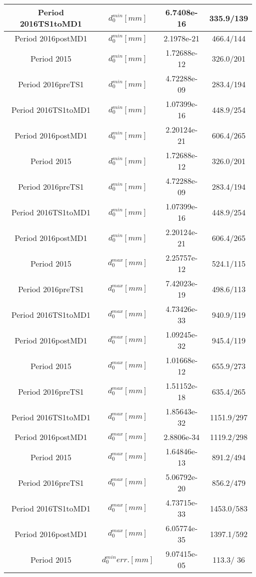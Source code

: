 \documentclass{article}
\begin{document}
\begin{longtable}{c|c|c|c}
\hline
 Period 2016TS1toMD1 & $d_{0}^{min} [mm]$ & 6.7408e-16 & 335.9/139\\
\hline
 Period 2016postMD1 & $d_{0}^{min} [mm]$ & 2.1978e-21 & 466.4/144\\
\hline
 Period 2015 & $d_{0}^{min} [mm]$ & 1.72688e-12 & 326.0/201\\
\hline
 Period 2016preTS1 & $d_{0}^{min} [mm]$ & 4.72288e-09 & 283.4/194\\
\hline
 Period 2016TS1toMD1 & $d_{0}^{min} [mm]$ & 1.07399e-16 & 448.9/254\\
\hline
 Period 2016postMD1 & $d_{0}^{min} [mm]$ & 2.20124e-21 & 606.4/265\\
\hline
 Period 2015 & $d_{0}^{min} [mm]$ & 1.72688e-12 & 326.0/201\\
\hline
 Period 2016preTS1 & $d_{0}^{min} [mm]$ & 4.72288e-09 & 283.4/194\\
\hline
 Period 2016TS1toMD1 & $d_{0}^{min} [mm]$ & 1.07399e-16 & 448.9/254\\
\hline
 Period 2016postMD1 & $d_{0}^{min} [mm]$ & 2.20124e-21 & 606.4/265\\
\hline
 Period 2015 & $d_{0}^{max} [mm]$ & 2.25757e-12 & 524.1/115\\
\hline
 Period 2016preTS1 & $d_{0}^{max} [mm]$ & 7.42023e-19 & 498.6/113\\
\hline
 Period 2016TS1toMD1 & $d_{0}^{max} [mm]$ & 4.73426e-33 & 940.9/119\\
\hline
 Period 2016postMD1 & $d_{0}^{max} [mm]$ & 1.09245e-32 & 945.4/119\\
\hline
 Period 2015 & $d_{0}^{max} [mm]$ & 1.01668e-12 & 655.9/273\\
\hline
 Period 2016preTS1 & $d_{0}^{max} [mm]$ & 1.51152e-18 & 635.4/265\\
\hline
 Period 2016TS1toMD1 & $d_{0}^{max} [mm]$ & 1.85643e-32 & 1151.9/297\\
\hline
 Period 2016postMD1 & $d_{0}^{max} [mm]$ & 2.8806e-34 & 1119.2/298\\
\hline
 Period 2015 & $d_{0}^{max} [mm]$ & 1.64846e-13 & 891.2/494\\
\hline
 Period 2016preTS1 & $d_{0}^{max} [mm]$ & 5.06792e-20 & 856.2/479\\
\hline
 Period 2016TS1toMD1 & $d_{0}^{max} [mm]$ & 4.73715e-33 & 1453.0/583\\
\hline
 Period 2016postMD1 & $d_{0}^{max} [mm]$ & 6.05774e-35 & 1397.1/592\\
\hline
 Period 2015 & $d_{0}^{min} err. [mm]$ & 9.07415e-05 & 113.3/ 36\\

\end{longtable}
\end{document}
